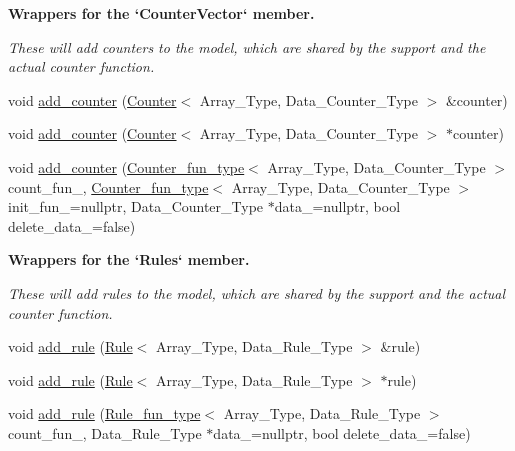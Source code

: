 \begin{Indent}\textbf{ Wrappers for the `\+Counter\+Vector` member.}\par
{\em These will add counters to the model, which are shared by the support and the actual counter function. }\begin{DoxyCompactItemize}
\item 
void \hyperlink{class_model_a1548bd4681944c3eb761a22a38ef5547}{add\+\_\+counter} (\hyperlink{class_counter}{Counter}$<$ Array\+\_\+\+Type, Data\+\_\+\+Counter\+\_\+\+Type $>$ \&counter)
\item 
void \hyperlink{class_model_a6c1f524daf08e10888a49318030616c4}{add\+\_\+counter} (\hyperlink{class_counter}{Counter}$<$ Array\+\_\+\+Type, Data\+\_\+\+Counter\+\_\+\+Type $>$ $\ast$counter)
\item 
void \hyperlink{class_model_a4e4a18943bda513a844dc11aa088a698}{add\+\_\+counter} (\hyperlink{typedefs_8hpp_ac0160f52f564dea3ac033b374cffbfe7}{Counter\+\_\+fun\+\_\+type}$<$ Array\+\_\+\+Type, Data\+\_\+\+Counter\+\_\+\+Type $>$ count\+\_\+fun\+\_\+, \hyperlink{typedefs_8hpp_ac0160f52f564dea3ac033b374cffbfe7}{Counter\+\_\+fun\+\_\+type}$<$ Array\+\_\+\+Type, Data\+\_\+\+Counter\+\_\+\+Type $>$ init\+\_\+fun\+\_\+=nullptr, Data\+\_\+\+Counter\+\_\+\+Type $\ast$data\+\_\+=nullptr, bool delete\+\_\+data\+\_\+=false)
\end{DoxyCompactItemize}
\end{Indent}
\begin{Indent}\textbf{ Wrappers for the `\+Rules` member.}\par
{\em These will add rules to the model, which are shared by the support and the actual counter function. }\begin{DoxyCompactItemize}
\item 
void \hyperlink{class_model_af2c3f6300b90e6a2a4deaebaf2b0e732}{add\+\_\+rule} (\hyperlink{class_rule}{Rule}$<$ Array\+\_\+\+Type, Data\+\_\+\+Rule\+\_\+\+Type $>$ \&rule)
\item 
void \hyperlink{class_model_aba5b01457e2f624766a72ba15b8cb6be}{add\+\_\+rule} (\hyperlink{class_rule}{Rule}$<$ Array\+\_\+\+Type, Data\+\_\+\+Rule\+\_\+\+Type $>$ $\ast$rule)
\item 
void \hyperlink{class_model_af3a1a343dfff4f40443bee4ddf76a0ba}{add\+\_\+rule} (\hyperlink{typedefs_8hpp_a2e147c9c0e8b65be614c98a5dd400d5c}{Rule\+\_\+fun\+\_\+type}$<$ Array\+\_\+\+Type, Data\+\_\+\+Rule\+\_\+\+Type $>$ count\+\_\+fun\+\_\+, Data\+\_\+\+Rule\+\_\+\+Type $\ast$data\+\_\+=nullptr, bool delete\+\_\+data\+\_\+=false)
\end{DoxyCompactItemize}
\end{Indent}
